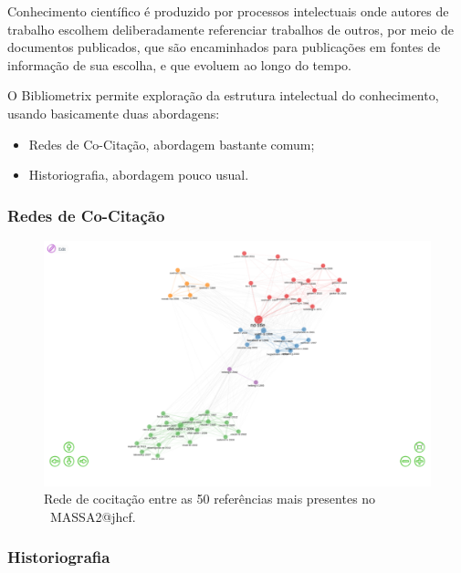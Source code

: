 Conhecimento científico é produzido por processos intelectuais onde autores de trabalho escolhem deliberadamente referenciar trabalhos de outros, por meio de documentos publicados, que são encaminhados para publicações em fontes de informação de sua escolha, e que evoluem ao longo do tempo.

O Bibliometrix permite exploração da estrutura intelectual do conhecimento, usando basicamente duas abordagens:
\begin{itemize}
    \item Redes de Co-Citação, abordagem bastante comum;
    \item Historiografia, abordagem pouco usual.
\end{itemize}

\subsubsection{Redes de Co-Citação}

\begin{figure}
    \centering
    \includegraphics[width=1\textwidth]{experiments/jhcf/PesqBibliogr/SimulacaoMultiagente/WoS-20220203/Estrutura/Intelectual/MASSA2-CoCitation-Network-50-Papers.png}
    \caption{Rede de cocitação entre as 50 referências mais presentes no  \dataset\ MASSA2@jhcf.}
    \label{fig:MASSA2-CoCitation-Network}
\end{figure}

\subsubsection{Historiografia}


